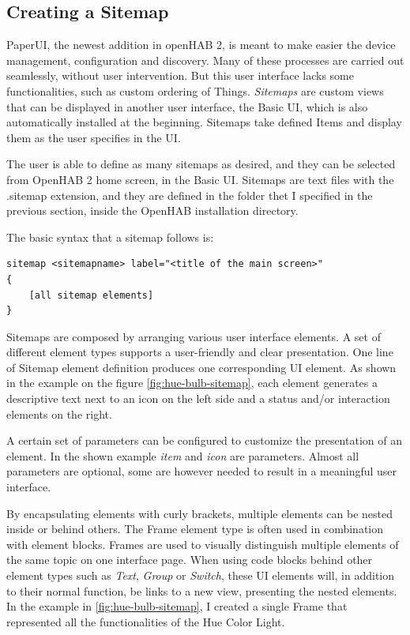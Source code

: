 \subsection{Creating a Sitemap}
PaperUI, the newest addition in openHAB 2, is meant to make easier the device management, configuration and discovery. Many of 
these processes are carried out seamlessly, without user intervention. But this user interface lacks some functionalities, such as
custom ordering of Things. \textit{Sitemaps} are custom views that can be displayed in another user interface, the Basic UI, which
is also automatically installed at the beginning.\cite{openHABDocs} Sitemaps take defined Items and display them as the user specifies 
in the UI.

The user is able to define as many sitemaps as desired, and they can be selected from OpenHAB 2 home screen, in the Basic UI. Sitemaps 
are text files with the .sitemap extension, and they are defined in the folder thet I specified in the previous section, inside the OpenHAB 
installation directory.

The basic syntax that a sitemap follows is:

\begin{lstlisting}[style=Consola]
sitemap <sitemapname> label="<title of the main screen>" 
{
    [all sitemap elements]
}
\end{lstlisting}

Sitemaps are composed by arranging various user interface elements. A set of different element types supports a user-friendly and 
clear presentation. One line of Sitemap element definition produces one corresponding UI element. As shown in the example on the
figure \ref{fig:hue-bulb-sitemap}, each element generates a descriptive text next to an icon on the left side and a status and/or 
interaction elements on the right.

A certain set of parameters can be configured to customize the presentation of an element. In the shown example \textit{item} and 
\textit{icon} are parameters. Almost all parameters are optional, some are however needed to result in a meaningful user interface. 

By encapsulating elements with curly brackets, multiple elements can be nested inside or behind others. The Frame element type is 
often used in combination with element blocks. Frames are used to visually distinguish multiple elements of the same topic on one 
interface page. When using code blocks behind other element types such as \textit{Text}, \textit{Group} or \textit{Switch}, these UI 
elements will, in addition to their normal function, be links to a new view, presenting the nested elements. In the example in 
\ref{fig:hue-bulb-sitemap}, I created a single Frame that represented all the functionalities of the Hue Color Light.


